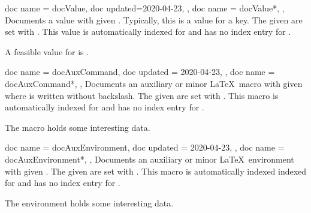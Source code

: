 % 
% 
% 





\begin{docCommands}[doc parameter=\oarg{options}\marg{name}]
{
  {
    doc name = docValue,
    doc updated=2020-04-23,
  },
  {
    doc name = docValue*,
  },
}
Documents a value with given . Typically, this is a value for a key.
The given  are set with .
This value is automatically indexed for 
and has no index entry for .
\begin{dispExample}
A feasible value for  is .
\end{dispExample}
\end{docCommands}



\begin{docCommands}[doc parameter=\oarg{options}\marg{name}]
{
  {
    doc name    = docAuxCommand,
    doc updated = 2020-04-23,
  },
  {
    doc name = docAuxCommand*,
  },
}
Documents an auxiliary or minor \LaTeX\ macro with given 
where  is written without backslash.
The given  are set with .
This macro is automatically indexed for 
and has no index entry for .
\begin{dispExample}
The macro  holds some interesting data.
\end{dispExample}
\end{docCommands}



\begin{docCommands}[doc parameter=\oarg{options}\marg{name}]
{
  {
    doc name    = docAuxEnvironment,
    doc updated = 2020-04-23,
  },
  {
    doc name = docAuxEnvironment*,
  },
}
Documents an auxiliary or minor \LaTeX\ environment with given .
The given  are set with .
This macro is automatically indexed indexed for 
and has no index entry for .
\begin{dispExample}
The environment  holds some interesting data.
\end{dispExample}
\end{docCommands}


